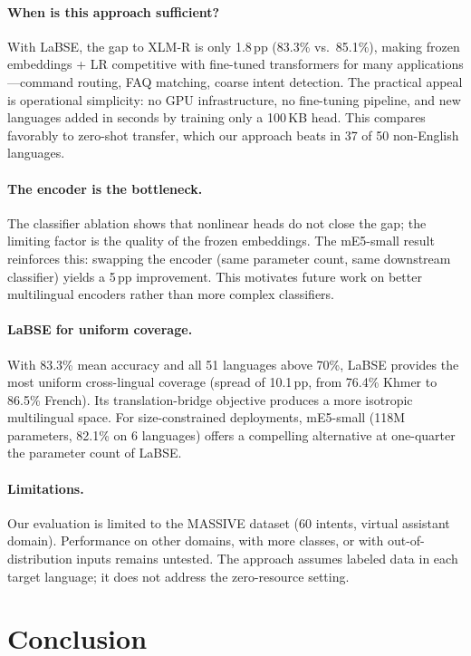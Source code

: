 \documentclass[11pt]{article}
\begin{document}
\paragraph{When is this approach sufficient?} With LaBSE, the gap to XLM-R is only 1.8\,pp (83.3\% vs.\ 85.1\%), making frozen embeddings + LR competitive with fine-tuned transformers for many applications---command routing, FAQ matching, coarse intent detection. The practical appeal is operational simplicity: no GPU infrastructure, no fine-tuning pipeline, and new languages added in seconds by training only a 100\,KB head. This compares favorably to zero-shot transfer, which our approach beats in 37 of 50 non-English languages.

\paragraph{The encoder is the bottleneck.} The classifier ablation shows that nonlinear heads do not close the gap; the limiting factor is the quality of the frozen embeddings. The mE5-small result reinforces this: swapping the encoder (same parameter count, same downstream classifier) yields a 5\,pp improvement. This motivates future work on better multilingual encoders rather than more complex classifiers.

\paragraph{LaBSE for uniform coverage.} With 83.3\% mean accuracy and all 51 languages above 70\%, LaBSE provides the most uniform cross-lingual coverage (spread of 10.1\,pp, from 76.4\% Khmer to 86.5\% French). Its translation-bridge objective produces a more isotropic multilingual space. For size-constrained deployments, mE5-small (118M parameters, 82.1\% on 6 languages) offers a compelling alternative at one-quarter the parameter count of LaBSE.

\paragraph{Limitations.} Our evaluation is limited to the MASSIVE dataset (60 intents, virtual assistant domain). Performance on other domains, with more classes, or with out-of-distribution inputs remains untested. The approach assumes labeled data in each target language; it does not address the zero-resource setting.


\section{Conclusion}
\end{document}
